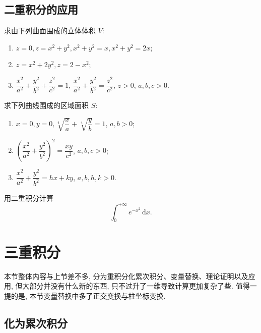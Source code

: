 \documentclass[../数学分析培优讲义.tex]{subfiles}
\begin{document}
\newpage

\subsection{二重积分的应用}

\begin{example}
求由下列曲面围成的立体体积 $V$:
\begin{enumerate}[label=(\arabic*)]
    \item $z=0,z=x^2+y^2,x^2+y^2=x,x^2+y^2=2x$;
    \item $z=x^2+2y^2,z=2-x^2$;
    \item $\dfrac{x^2}{a^2}+\dfrac{y^2}{b^2}+\dfrac{z^2}{c^2}=1$, $\dfrac{x^2}{a^2}+\dfrac{y^2}{b^2}=\dfrac{z^2}{c^2}$, $z>0$, $a,b,c>0$.
\end{enumerate}
\end{example}
\exampleblank

\begin{example}
求下列曲线围成的区域面积 $S$:
\begin{enumerate}[label=(\arabic*)]
    \item $x=0,y=0,\sqrt[4]{\dfrac{x}{a}}+\sqrt[4]{\dfrac{y}{b}}=1$, $a,b>0$;
    \item $\left(\dfrac{x^2}{a^2}+\dfrac{y^2}{b^2}\right)^2=\dfrac{xy}{c^2}$, $a,b,c>0$;
    \item $\dfrac{x^2}{a^2}+\dfrac{y^2}{b^2}=hx+ky$, $a,b,h,k>0$.
\end{enumerate}
\end{example}
\exampleblank

\begin{example}[\markstar]
用二重积分计算
\[
    \int_0^{+\infty}e^{-x^2}\,\mathrm{d}x.
\]
\end{example}
\exampleblank


\newpage

\section{三重积分}

本节整体内容与上节差不多, 分为重积分化累次积分、变量替换、理论证明以及应用, 但大部分并没有什么新的东西, 只不过升了一维导致计算更加复杂了些. 值得一提的是, 本节变量替换中多了正交变换与柱坐标变换.


\newpage

\subsection{化为累次积分}
\end{document}
